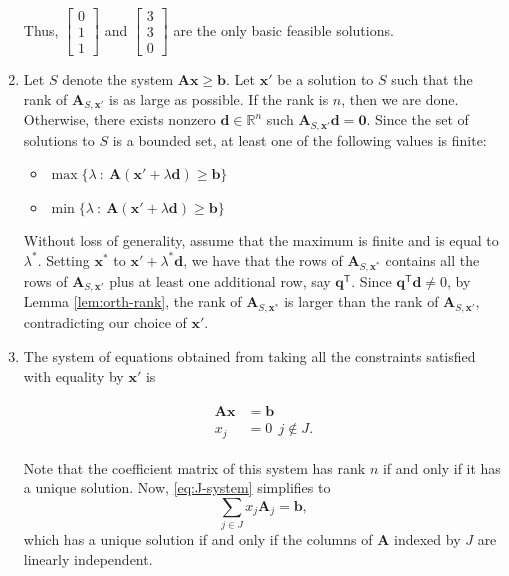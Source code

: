 \documentclass[]{book}
\newcommand{\RR}{\mathbb{R}}
\newcommand{\ssep}{~:~}
\newcommand{\T}{\mathsf{T}}
\newcommand{\mm}[1]{\mathbf{#1}}
\renewcommand{\vec}[1]{\mathbf{#1}}
\theoremstyle{definition}
\theoremstyle{definition}
\theoremstyle{remark}
\begin{document}
\begin{enumerate}
  Thus, \(\begin{bmatrix} 0 \\ 1 \\ 1 \end{bmatrix}\) and
  \(\begin{bmatrix} 3 \\ 3 \\ 0 \end{bmatrix}\) are the only basic
  feasible solutions.
\item
  Let \(S\) denote the system \(\mm{A}\vec{x} \geq \vec{b}\). Let
  \(\vec{x}'\) be a solution to \(S\) such that the rank of
  \(\mm{A}_{S,\vec{x}'}\) is as large as possible. If the rank is \(n\),
  then we are done. Otherwise, there exists nonzero
  \(\vec{d} \in \RR^n\) such \(\mm{A}_{S,\vec{x}'}\vec{d} = \vec{0}\).
  Since the set of solutions to \(S\) is a bounded set, at least one of
  the following values is finite:

  \begin{itemize}
  \item
    \(\max \{ \lambda \ssep \mm{A} (\vec{x}'+\lambda\vec{d}) \geq\vec{b}\}\)
  \item
    \(\min \{ \lambda \ssep \mm{A} (\vec{x}'+\lambda\vec{d}) \geq\vec{b}\}\)
  \end{itemize}

  Without loss of generality, assume that the maximum is finite and is
  equal to \(\lambda^*\). Setting \(\vec{x}^*\) to
  \(\vec{x}'+\lambda^* \vec{d}\), we have that the rows of
  \(\mm{A}_{S,\vec{x}^*}\) contains all the rows of
  \(\mm{A}_{S,\vec{x}'}\) plus at least one additional row, say
  \(\vec{q}^\T\). Since \(\vec{q}^\T \vec{d} \neq 0\), by Lemma
  \ref{lem:orth-rank}, the rank of \(\mm{A}_{S,\vec{x}^*}\) is larger
  than the rank of \(\mm{A}_{S,\vec{x}'}\), contradicting our choice of
  \(\vec{x}'\).
\item
  The system of equations obtained from taking all the constraints
  satisfied with equality by \(\vec{x}'\) is

  \begin{align}
     \begin{split}
       \mm{A}\vec{x} & = \vec{b} \\
       x_j & = 0 ~~j\notin J.
     \end{split}\label{eq:J-system}
  \end{align}

  Note that the coefficient matrix of this system has rank \(n\) if and
  only if it has a unique solution. Now, \eqref{eq:J-system} simplifies to
  \[ \sum_{j \in J} x_j \mm{A}_j = \vec{b},
  \] which has a unique solution if and only if the columns of
  \(\mm{A}\) indexed by \(J\) are linearly independent.
\end{enumerate}
\end{document}
